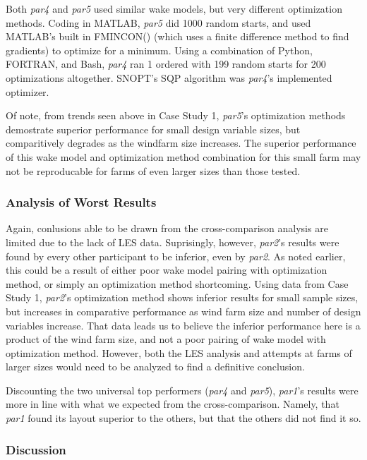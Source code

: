 	Both \textit{par4} and \textit{par5} used similar wake models, but very different optimization methods.
	Coding in MATLAB, \textit{par5} did 1000 random starts, and used MATLAB's built in FMINCON() (which uses a finite difference method to find gradients) to optimize for a minimum.
	Using a combination of Python, FORTRAN, and Bash, \textit{par4} ran 1 ordered with 199 random starts for 200 optimizations altogether.
	SNOPT's SQP algorithm was \textit{par4}'s implemented optimizer.

	Of note, from trends seen above in Case Study 1, \textit{par5}'s optimization methods demostrate superior performance for small design variable sizes, but comparitively degrades as the windfarm size increases.
	The superior performance of this wake model and optimization method combination for this small farm may not be reproducable for farms of even larger sizes than those tested.

\subsubsection{Analysis of Worst Results}

	Again, conlusions able to be drawn from the cross-comparison analysis are limited due to the lack of LES data.
	Suprisingly, however, \textit{par2}'s results were found by every other participant to be inferior, even by \textit{par2}.
	As noted earlier, this could be a result of either poor wake model pairing with optimization method, or simply an optimization method shortcoming.
	Using data from Case Study 1, \textit{par2}'s optimization method shows inferior results for small sample sizes, but increases in comparative performance as wind farm size and number of design variables increase.
	That data leads us to believe the inferior performance here is a product of the wind farm size, and not a poor pairing of wake model with optimization method.
	However, both the LES analysis and attempts at farms of larger sizes would need to be analyzed to find a definitive conclusion. 

	Discounting the two universal top performers (\textit{par4} and \textit{par5}), \textit{par1}'s results were more in line with what we expected from the cross-comparison.
	Namely, that \textit{par1} found its layout superior to the others, but that the others did not find it so.

\subsubsection{Discussion}

